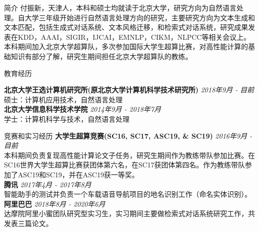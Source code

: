 \documentclass{resume} %
\begin{document}

\begin{rSection}{简介}
    付振新，天津人，本科和硕士均就读于北京大学，研究方向为自然语言处理。自大学三年级开始进行自然语言处理方向的研究，主要研究方向为文本生成和文本匹配，包括生成式对话系统、文本风格迁移，和检索式对话系统，研究成果发表在KDD，AAAI，SIGIR，IJCAI，EMNLP，CIKM，NLPCC等相关会议上。
    本科期间加入北京大学超算队，多次参加国际大学生超算比赛，对高性能计算的基础知识有部分了解，研究生期间担任北京大学超算队的教练。
\end{rSection}

\begin{rSection}{教育经历}

    {\bf 北京大学王选计算机研究所(原北京大学计算机科学技术研究所)} \hfill {\em 2018年9月 - 目前} 
    \\ 硕士：计算机应用技术，自然语言处理 \\
    {\bf 北京大学信息科学技术学院} \hfill {\em 2014年9月 - 2018年7月}
    \\ 学士：计算机科学与技术，自然语言处理
\end{rSection}

\begin{rSection}{竞赛和实习经历}
    \textbf{大学生超算竞赛(SC16, SC17, ASC19, \& SC19)} \hfill {\em 2016年9月 - 目前}\\
    本科期间负责复现高性能计算论文子任务，研究生期间作为教练带队参加比赛。在SC16世界大学生超算比赛获团体第六名，在SC17获团体第四名。作为教练带队参加了ASC19和SC19，并在ASC19获一等奖。 \\
    \textbf{腾讯} \hfill {\em 2017年4月 - 2017年8月} \\
    智能助手的测试并负责一个车载语音导航项目的地名识别工作（命名实体识别）。\\
    \textbf{阿里巴巴} \hfill {\em 2018年8月 - 2020年6月}\\
    达摩院阿里小蜜团队研究型实习生，实习期间主要做检索式对话系统研究工作，共发表三篇论文。
\end{rSection}
\end{document}
